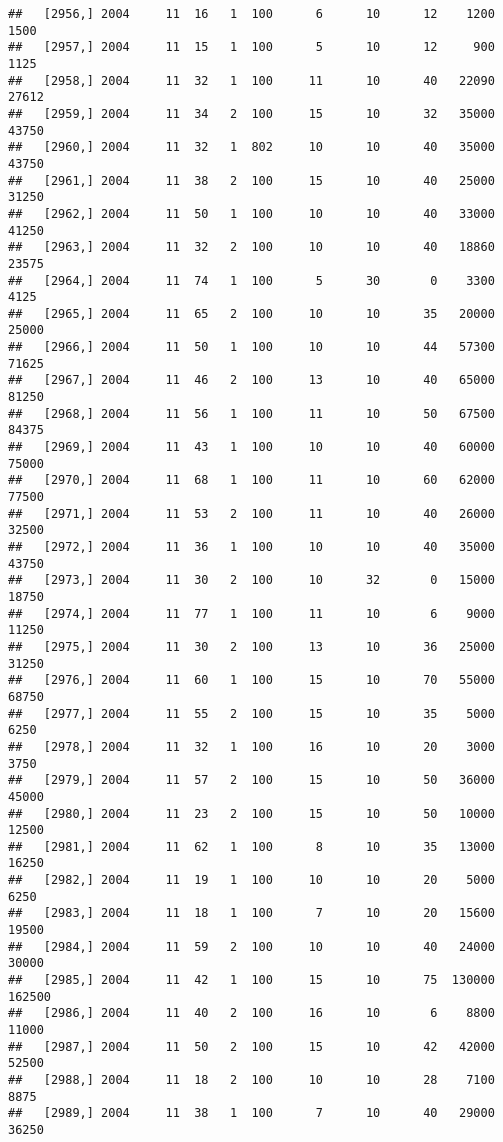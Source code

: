 \documentclass{article}\usepackage[]{graphicx}\usepackage[]{color}
\makeatletter
\newenvironment{kframe}{%
 \def\at@end@of@kframe{}%
 \ifinner\ifhmode%
  \def\at@end@of@kframe{\end{minipage}}%
  \begin{minipage}{\columnwidth}%
 \fi\fi%
 \def\FrameCommand##1{\hskip\@totalleftmargin \hskip-\fboxsep
 \colorbox{shadecolor}{##1}\hskip-\fboxsep
     \hskip-\linewidth \hskip-\@totalleftmargin \hskip\columnwidth}%
 \MakeFramed {\advance\hsize-\width
   \@totalleftmargin\z@ \linewidth\hsize
   \@setminipage}}%
 {\par\unskip\endMakeFramed%
 \at@end@of@kframe}
\newenvironment{knitrout}{}{} %
\makeatother
\begin{document}
\begin{knitrout}
\begin{kframe}
\begin{verbatim}
##   [2956,] 2004     11  16   1  100      6      10      12    1200    1500
##   [2957,] 2004     11  15   1  100      5      10      12     900    1125
##   [2958,] 2004     11  32   1  100     11      10      40   22090   27612
##   [2959,] 2004     11  34   2  100     15      10      32   35000   43750
##   [2960,] 2004     11  32   1  802     10      10      40   35000   43750
##   [2961,] 2004     11  38   2  100     15      10      40   25000   31250
##   [2962,] 2004     11  50   1  100     10      10      40   33000   41250
##   [2963,] 2004     11  32   2  100     10      10      40   18860   23575
##   [2964,] 2004     11  74   1  100      5      30       0    3300    4125
##   [2965,] 2004     11  65   2  100     10      10      35   20000   25000
##   [2966,] 2004     11  50   1  100     10      10      44   57300   71625
##   [2967,] 2004     11  46   2  100     13      10      40   65000   81250
##   [2968,] 2004     11  56   1  100     11      10      50   67500   84375
##   [2969,] 2004     11  43   1  100     10      10      40   60000   75000
##   [2970,] 2004     11  68   1  100     11      10      60   62000   77500
##   [2971,] 2004     11  53   2  100     11      10      40   26000   32500
##   [2972,] 2004     11  36   1  100     10      10      40   35000   43750
##   [2973,] 2004     11  30   2  100     10      32       0   15000   18750
##   [2974,] 2004     11  77   1  100     11      10       6    9000   11250
##   [2975,] 2004     11  30   2  100     13      10      36   25000   31250
##   [2976,] 2004     11  60   1  100     15      10      70   55000   68750
##   [2977,] 2004     11  55   2  100     15      10      35    5000    6250
##   [2978,] 2004     11  32   1  100     16      10      20    3000    3750
##   [2979,] 2004     11  57   2  100     15      10      50   36000   45000
##   [2980,] 2004     11  23   2  100     15      10      50   10000   12500
##   [2981,] 2004     11  62   1  100      8      10      35   13000   16250
##   [2982,] 2004     11  19   1  100     10      10      20    5000    6250
##   [2983,] 2004     11  18   1  100      7      10      20   15600   19500
##   [2984,] 2004     11  59   2  100     10      10      40   24000   30000
##   [2985,] 2004     11  42   1  100     15      10      75  130000  162500
##   [2986,] 2004     11  40   2  100     16      10       6    8800   11000
##   [2987,] 2004     11  50   2  100     15      10      42   42000   52500
##   [2988,] 2004     11  18   2  100     10      10      28    7100    8875
##   [2989,] 2004     11  38   1  100      7      10      40   29000   36250

\end{verbatim}
\end{kframe}
\end{knitrout}
\end{document}
